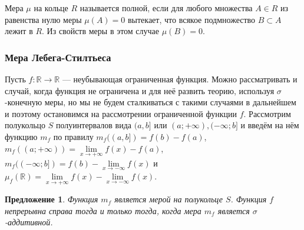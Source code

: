 \documentclass[12pt]{article}
\newtheorem{proposition}[theorem]{Предложение}
\numberwithin{theorem}{section}
\theoremstyle{definition}
\newcommand{\defin}[2]{\hypertarget{#2}{{\color{red} #1}}}
\newcommand{\RR}{\mathbb{R}}
\begin{document}
	Мера $ \mu $ на кольце $ R $ называется \defin{полной}{complete measure}, если для любого множества $ A \in R $ 
	из равенства нулю меры $ \mu(A) = 0 $ вытекает, что всякое подмножество $ B \subset A $ лежит в $ R $.
	Из свойств меры в этом случае $ \mu(B) = 0 $.
	
	\subsubsection{Мера Лебега-Стилтьеса}
	
	Пусть $ f \colon \RR \to \RR $ --- неубывающая ограниченная функция. Можно рассматривать и случай, когда функция не ограничена и для неё развить теорию, используя $ \sigma $-конечную меры, но мы не будем сталкиваться с такими случаями в дальнейшем и поэтому остановимся на рассмотрении ограниченной функции $ f $.
	Рассмотрим полукольцо $ S $ полуинтервалов вида $ (a, b] $ или $ (a; +\infty), (-\infty; b] $
	и введём на нём функцию $ m_f $ по правилу $ m_f((a, b]) = f(b) - f(a) $,
	$ m_f((a; +\infty)) = \lim\limits_{x \to +\infty} f(x) - f(a) $,
	$ m_f((-\infty; b]) = f(b) - \lim\limits_{x \to -\infty} f(x) $
	и $ \mu_f(\RR) = \lim\limits_{x \to +\infty} f(x) - \lim\limits_{x \to -\infty} f(x) $.
	
	\begin{proposition}
		Функция $ m_f $ является мерой на полукольце $ S $.
		Функция $ f $ непрерывна справа тогда и только тогда, когда мера $ m_f $ является $ \sigma $-аддитивной.
	\end{proposition}
	
\end{document}
